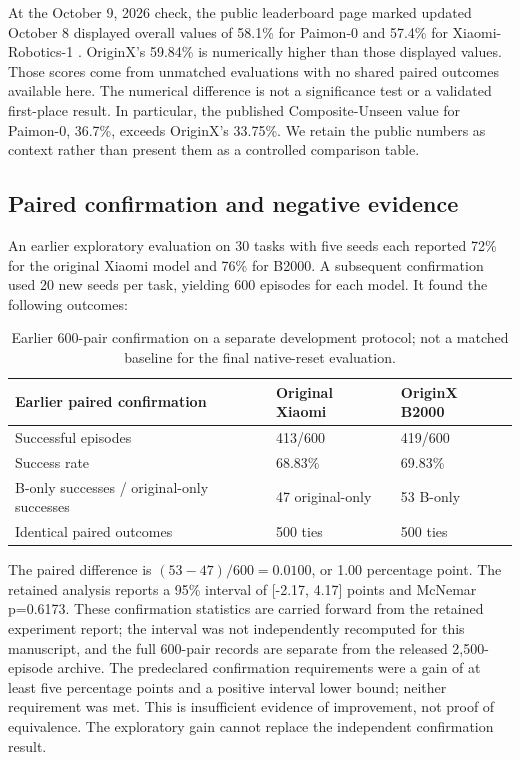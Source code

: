 \documentclass[10pt,twocolumn,letterpaper]{article}
\begin{document}
At the October 9, 2026 check, the public leaderboard page marked updated October 8 displayed overall values of 58.1\% for Paimon-0 and 57.4\% for Xiaomi-Robotics-1 \cite{r10}. OriginX's 59.84\% is numerically higher than those displayed values. Those scores come from unmatched evaluations with no shared paired outcomes available here. The numerical difference is not a significance test or a validated first-place result. In particular, the published Composite-Unseen value for Paimon-0, 36.7\%, exceeds OriginX's 33.75\%. We retain the public numbers as context rather than present them as a controlled comparison table.


\subsection{Paired confirmation and negative evidence}

An earlier exploratory evaluation on 30 tasks with five seeds each reported 72\% for the original Xiaomi model and 76\% for B2000. A subsequent confirmation used 20 new seeds per task, yielding 600 episodes for each model. It found the following outcomes:


\begin{table}[ht]\centering\footnotesize\begin{tabularx}{\columnwidth}{@{}XXX@{}}\toprule

Earlier paired confirmation & Original Xiaomi & OriginX B2000\\\midrule

Successful episodes & 413/600 & 419/600\\

Success rate & 68.83\% & 69.83\%\\

B-only successes / original-only successes & 47 original-only & 53 B-only\\

Identical paired outcomes & 500 ties & 500 ties\\

\bottomrule\end{tabularx}

\caption{Earlier 600-pair confirmation on a separate development protocol; not a matched baseline for the final native-reset evaluation.}\end{table}

The paired difference is $(53-47)/600=0.0100$, or 1.00 percentage point. The retained analysis reports a 95\% interval of [-2.17, 4.17] points and McNemar p=0.6173. These confirmation statistics are carried forward from the retained experiment report; the interval was not independently recomputed for this manuscript, and the full 600-pair records are separate from the released 2,500-episode archive. The predeclared confirmation requirements were a gain of at least five percentage points and a positive interval lower bound; neither requirement was met. This is insufficient evidence of improvement, not proof of equivalence. The exploratory gain cannot replace the independent confirmation result.
\end{document}
